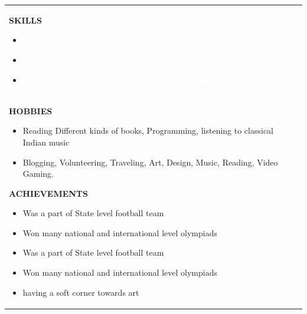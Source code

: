 \documentclass{article}
\begin{document}
{\begin{longtable}{ p{6cm}p{12cm} }
{\textbf{\uppercase{skills}}}\newline

\begin{itemize}[noitemsep,nolistsep]
	\item \textcolor{WHITE}{AutoCAD, Solidworks, AutoCAD Mechanical, Autodesk Inventor}
	\item \textcolor{WHITE}{Excel, C++, HTML, Javascript, Python}
	\item \textcolor{WHITE}{Management, Leadership, Organization, Public Speaking, Problem-solving, Teamwork}\newline
\end{itemize}


{\textbf{\uppercase{Hobbies}}}\newline

\begin{itemize}[noitemsep,nolistsep]
	\item Reading Different kinds of books, Programming, listening to classical Indian music
	\item Blogging, Volunteering, Traveling, Art, Design, Music, Reading, Video Gaming.\newline
\end{itemize}
{\textbf{\uppercase{Achievements}}}\newline

\begin{itemize}[noitemsep,nolistsep]
	\item Was a part of State level football team
	\item Won many national and international level olympiads
	\item Was a part of State level football team
	\item Won many national and international level olympiads
	\item having a soft corner towards art\newline
\end{itemize}
&  \\



\end{longtable} }
\end{document}
